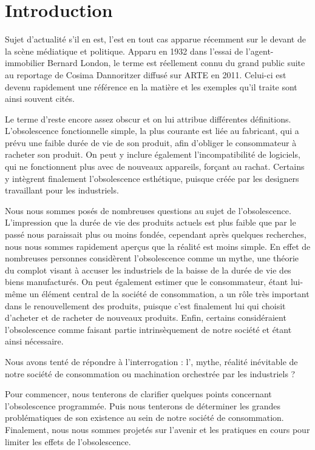\chapter*{Introduction}

Sujet d'actualité s'il en est, l'\op est en tout cas apparue récemment sur le devant de la scène médiatique et politique. Apparu en 1932 dans l'essai de l'agent-immobilier Bernard London, le terme est réellement connu du grand public suite au reportage de Cosima Dannoritzer diffusé sur ARTE en 2011. Celui-ci est devenu rapidement une référence en la matière et les exemples qu'il traite sont ainsi souvent cités.

Le terme d'\op reste encore assez obscur et on lui attribue différentes définitions. L’obsolescence fonctionnelle simple, la plus courante est liée au fabricant, qui a prévu une faible durée de vie de son produit, afin d'obliger le consommateur à racheter son produit. On peut y inclure également l'incompatibilité de logiciels, qui ne fonctionnent plus avec de nouveaux appareils, forçant au rachat. Certains y intègrent finalement l'obsolescence esthétique, puisque créée par les designers travaillant pour les industriels.

Nous nous sommes posés de nombreuses questions au sujet de l'obsolescence. L'impression que la durée de vie des produits actuels est plus faible que par le passé nous paraissait plus ou moins fondée, cependant après quelques recherches, nous nous sommes rapidement aperçus que la réalité est moins simple. En effet de nombreuses personnes considèrent l'obsolescence comme un mythe, une théorie du complot visant à accuser les industriels de la baisse de la durée de vie des biens manufacturés. On peut également estimer que le consommateur, étant lui-même un élément central de la société de consommation, a un rôle très important dans le renouvellement des produits, puisque c'est finalement lui qui choisit d'acheter et de racheter de nouveaux produits. Enfin, certains considéraient l'obsolescence comme faisant partie intrinsèquement de notre société et étant ainsi nécessaire.

\medbreak Nous avons tenté de répondre à l'interrogation : l'\op, mythe, réalité inévitable de notre société de consommation ou machination orchestrée par les industriels ?

\medbreak Pour commencer, nous tenterons de clarifier quelques points concernant l'obsolescence programmée. Puis nous tenterons de déterminer les grandes problématiques de son existence au sein de notre société de consommation. Finalement, nous nous sommes projetés sur l'avenir et les pratiques en cours pour limiter les effets de l'obsolescence.

